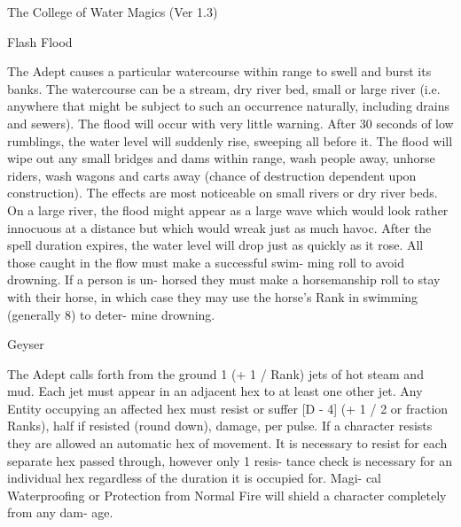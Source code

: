 \begin{Chapter}{The College of Water Magics (Ver 1.3)}
\begin{spell}[S-3]{Flash Flood }

\begin{effects}
The Adept causes a particular watercourse 
within  range  to  swell  and  burst  its  banks.  The 
watercourse  can  be  a  stream,  dry  river  bed,  small 
or  large  river  (i.e.  anywhere  that  might  be  subject 
to  such  an  occurrence  naturally,  including  drains 
and  sewers).  The  flood  will  occur  with  very  little 
warning.  After  30  seconds  of  low  rumblings,  the 
water  level  will suddenly rise, sweeping all before 
it.  The  flood  will  wipe  out  any  small  bridges  and 
dams  within  range,  wash  people  away,  unhorse 
riders,  wash  wagons  and  carts  away  (chance  of 
destruction  dependent  upon  construction).  The 
effects  are  most  noticeable  on  small  rivers  or  dry 
river beds. On a large river, the flood might appear 
as a large wave which would look rather innocuous 
at a distance  but  which  would  wreak  just as  much 
havoc.  After  the  spell  duration  expires,  the  water 
level  will drop just as quickly as it rose.  All those 
caught  in  the  flow  must  make  a  successful  swim-
ming  roll  to  avoid  drowning.  If  a  person  is  un-
horsed they must make a horsemanship roll to stay 
with  their  horse,  in  which  case  they  may  use  the 
horse’s  Rank  in  swimming  (generally  8)  to  deter-
mine drowning. 

\end{effects}
\end{spell}

\begin{spell}[S-4]{Geyser }

\begin{effects}
The Adept calls forth from the ground 1 (+ 
1 / Rank) jets of hot steam and mud. Each jet must 
appear  in  an  adjacent hex  to  at  least one  other  jet. 
Any  Entity  occupying  an  affected  hex  must  resist 
or suffer [D - 4] (+ 1 / 2 or fraction Ranks), half if 
resisted  (round  down),  damage,  per  pulse.  If  a 
character resists they are allowed an automatic hex 
of  movement.  It  is  necessary  to  resist  for  each 
separate hex passed through, however only 1 resis-
tance  check  is  necessary  for  an  individual  hex 
regardless of the duration it is occupied for. Magi-
cal Waterproofing  or  Protection  from Normal  Fire 
will  shield  a  character  completely  from  any  dam-
age. 


\end{effects}
\end{spell}
\end{Chapter}
